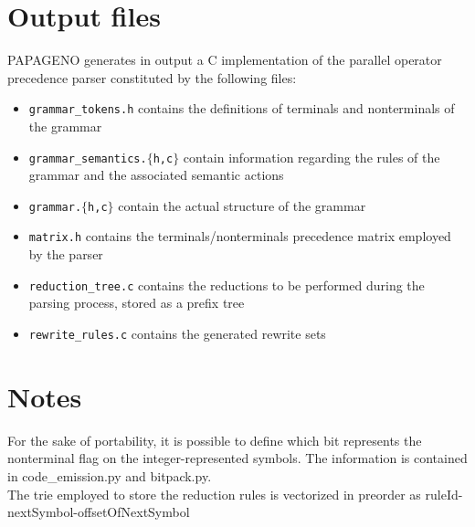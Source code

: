 \documentclass[a4paper,10pt]{article}
\begin{document}
\section{Output files}

PAPAGENO generates in output a C implementation of the parallel operator precedence parser constituted by the following files:
\begin{itemize}
 \item \texttt{grammar\_tokens.h} contains the definitions of terminals and nonterminals of the grammar
 \item \texttt{grammar\_semantics.$\{$h,c$\}$} contain information regarding the rules of the grammar and the associated semantic actions
 \item \texttt{grammar.$\{$h,c$\}$} contain the actual structure of the grammar
 \item \texttt{matrix.h} contains the terminals/nonterminals precedence matrix employed by the parser
 \item \texttt{reduction\_tree.c} contains the reductions to be performed during the parsing process, stored as a prefix tree
 \item \texttt{rewrite\_rules.c} contains the generated rewrite sets
\end{itemize}

\section{Notes}
For the sake of portability, it is possible to define which bit represents the nonterminal flag on the integer-represented symbols.
The information is contained in code\_emission.py and bitpack.py.\\

The trie employed to store the reduction rules is vectorized in preorder as ruleId-nextSymbol-offsetOfNextSymbol
\end{document}
